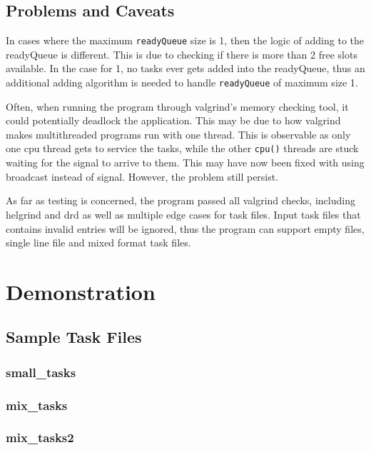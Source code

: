 \documentclass[a4paper, 12pt, titlepage]{article}
\newcommand{\code}[1]{\small\texttt{#1}\normalsize}
\begin{document}
\subsection{Problems and Caveats}
In cases where the maximum \code{readyQueue} size is 1, then the logic of
adding to the readyQueue is different. This is due to checking if there is more
than 2 free slots available. In the case for 1, no tasks ever gets added into
the readyQueue, thus an additional adding algorithm is needed to handle
\code{readyQueue} of maximum size 1.

Often, when running the program through valgrind's memory checking tool, it
could potentially deadlock the application. This may be due to how valgrind
makes multithreaded programs run with one thread. This is observable as only
one cpu thread gets to service the tasks, while the other \code{cpu()} threads
are stuck waiting for the signal to arrive to them. This may have now been
fixed with using broadcast instead of signal. However, the problem still
persist.

As far as testing is concerned, the program passed all valgrind checks,
including helgrind and drd as well as multiple edge cases for task files. Input
task files that contains invalid entries will be ignored, thus the program can
support empty files, single line file and mixed format task files.

\newpage
\section{Demonstration}
\subsection{Sample Task Files}
\subsubsection{small\_tasks}


\subsubsection{mix\_tasks}


\subsubsection{mix\_tasks2}

\end{document}
